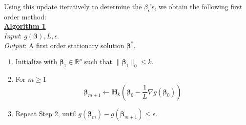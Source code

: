 \documentclass[12pt]{article}
\newcommand{\M}{\mathbf}
\newcommand{\MS}{\boldsymbol}
\newcommand{\R}{\mathbb{R}}
\newcommand{\1}{\mathds{1}}
\begin{document}
Using this update iteratively to determine the $\beta_i$'s, we obtain the following first order method:\\

\underline{\bf Algorithm 1}\\

\emph{Input}: $g(\MS \beta), L, \epsilon$.\\

\emph{Output}: A first order stationary solution $\MS \beta^*$.

\begin{enumerate}
	\item Initialize with $\MS \beta_1 \in \R^p$ such that $\|\MS \beta_1\|_0 \le k$.
	\item For $m \ge 1$
	\[
	\MS \beta_{m+1} \leftarrow \M H_k(\MS \beta_0 - \frac{1}{L} \nabla g(\MS \beta_0))
	\]
	\item Repeat Step 2, until $g(\MS \beta_m) - g(\MS \beta_{m+1}) \le \epsilon$.
\end{enumerate}
\end{document}
